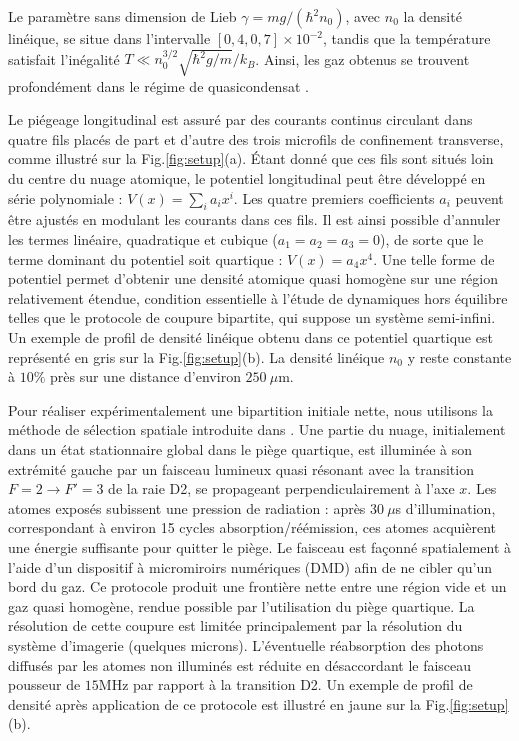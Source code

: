 




Le paramètre sans dimension de Lieb $\gamma = m g / (\hbar^2 n_0)$, avec $n_0$ la densité linéique, se situe dans l’intervalle $[0{,}4,0{,}7] \times 10^{-2}$, tandis que la température satisfait l’inégalité $T \ll n_0^{3/2} \sqrt{\hbar^2 g / m} / k_B$. Ainsi, les gaz obtenus se trouvent profondément dans le régime de quasicondensat \cite{PhysRevLett.91.040403}.

Le piégeage longitudinal est assuré par des courants continus circulant dans quatre fils placés de part et d’autre des trois microfils de confinement transverse, comme illustré sur la Fig.\ref{fig:setup}(a). Étant donné que ces fils sont situés loin du centre du nuage atomique, le potentiel longitudinal peut être développé en série polynomiale : $V(x) = \sum_i a_i x^i$. Les quatre premiers coefficients $a_i$ peuvent être ajustés en modulant les courants dans ces fils. Il est ainsi possible d’annuler les termes linéaire, quadratique et cubique ($a_1 = a_2 = a_3 = 0$), de sorte que le terme dominant du potentiel soit quartique : $V(x) = a_4 x^4$. Une telle forme de potentiel permet d’obtenir une densité atomique quasi homogène sur une région relativement étendue, condition essentielle à l’étude de dynamiques hors équilibre telles que le protocole de coupure bipartite, qui suppose un système semi-infini. Un exemple de profil de densité linéique obtenu dans ce potentiel quartique est représenté en gris sur la Fig.\ref{fig:setup}(b). La densité linéique $n_0$ y reste constante à $10\%$ près sur une distance d’environ $250~\mu$m.

Pour réaliser expérimentalement une bipartition initiale nette, nous utilisons la méthode de sélection spatiale introduite dans \cite{PhysRevLett.133.113402}. Une partie du nuage, initialement dans un état stationnaire global dans le piège quartique, est illuminée à son extrémité gauche par un faisceau lumineux quasi résonant avec la transition $F=2 \rightarrow F'=3$ de la raie D2, se propageant perpendiculairement à l’axe $x$. Les atomes exposés subissent une pression de radiation : après $30~\mu$s d’illumination, correspondant à environ 15 cycles absorption/réémission, ces atomes acquièrent une énergie suffisante pour quitter le piège. Le faisceau est façonné spatialement à l’aide d’un dispositif à micromiroirs numériques (DMD) afin de ne cibler qu’un bord du gaz. Ce protocole produit une frontière nette entre une région vide et un gaz quasi homogène, rendue possible par l’utilisation du piège quartique. La résolution de cette coupure est limitée principalement par la résolution du système d’imagerie (quelques microns). L’éventuelle réabsorption des photons diffusés par les atomes non illuminés est réduite en désaccordant le faisceau pousseur de $15$MHz par rapport à la transition D2. Un exemple de profil de densité après application de ce protocole est illustré en jaune sur la Fig.\ref{fig:setup}(b).

